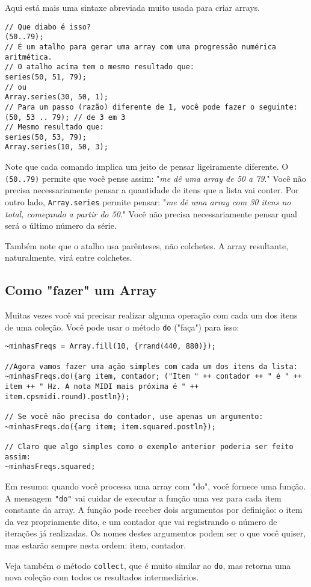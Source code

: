 Aqui está mais uma sintaxe abreviada muito usada para criar arrays.

 
\begin{lstlisting}[style=SuperCollider-IDE, basicstyle=\scttfamily\footnotesize]
// Que diabo é isso?
(50..79);
// É um atalho para gerar uma array com uma progressão numérica aritmética.
// O atalho acima tem o mesmo resultado que:
series(50, 51, 79);
// ou
Array.series(30, 50, 1);
// Para um passo (razão) diferente de 1, você pode fazer o seguinte:
(50, 53 .. 79); // de 3 em 3
// Mesmo resultado que:
series(50, 53, 79);
Array.series(10, 50, 3);
\end{lstlisting}

Note que cada comando implica um jeito de pensar ligeiramente diferente. O \texttt{(50..79)} permite que você pense assim: "\emph{me dê uma array de 50 a 79}." Você não precisa necessariamente pensar a quantidade de itens que a lista vai conter. Por outro lado, \texttt{Array.series} permite pensar: "\emph{me dê uma array com 30 itens no total, começando a partir do 50}." Você não precisa necessariamente pensar qual será o último número da série.

Também note que o atalho usa parênteses, não colchetes. A array resultante, naturalmente, virá entre colchetes.
\subsection{Como "fazer" um Array}

Muitas vezes você vai precisar realizar alguma operação com cada um dos itens de uma coleção. Você pode usar o método \texttt{do} ("faça") para isso:


\begin{lstlisting}[style=SuperCollider-IDE, basicstyle=\scttfamily\footnotesize]
~minhasFreqs = Array.fill(10, {rrand(440, 880)});

//Agora vamos fazer uma ação simples com cada um dos itens da lista:
~minhasFreqs.do({arg item, contador; ("Item " ++ contador ++ " é " ++ item ++ " Hz. A nota MIDI mais próxima é " ++ item.cpsmidi.round).postln});

// Se você não precisa do contador, use apenas um argumento:
~minhasFreqs.do({arg item; item.squared.postln});

// Claro que algo simples como o exemplo anterior poderia ser feito assim:
~minhasFreqs.squared;
\end{lstlisting}
 

Em resumo: quando você processa uma array com "do", você fornece uma função. A mensagem \texttt{"do"} vai cuidar de executar a função uma vez para cada item constante da array. A função pode receber dois argumentos por definição: o item da vez propriamente dito, e um contador que vai registrando o número de iterações já realizadas. Os nomes destes argumentos podem ser o que você quiser, mas estarão sempre nesta ordem: item, contador.

Veja também o método \texttt{collect}, que é muito similar ao \texttt{do}, mas retorna uma nova coleção com todos os resultados intermediários.
